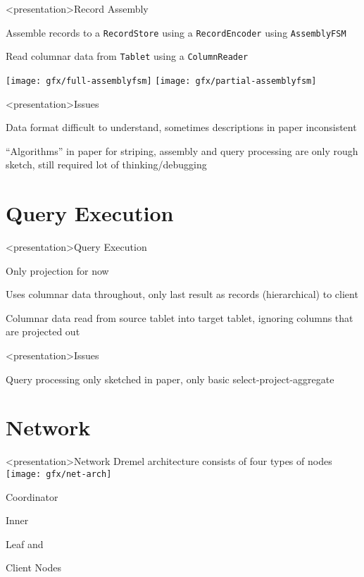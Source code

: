 \begin{frame}<presentation>{Record Assembly}
\begin{niitemize}
 \item Assemble records to a \texttt{RecordStore} using a
  \texttt{RecordEncoder} using \texttt{AssemblyFSM}
 \item Read columnar data from \texttt{Tablet} using a \texttt{ColumnReader}
\end{niitemize}

\texttt{[image: gfx/full-assemblyfsm]}
\hfill
\texttt{[image: gfx/partial-assemblyfsm]}
\end{frame}

\begin{frame}<presentation>{Issues}
\begin{niitemize}
 \item Data format difficult to understand, sometimes descriptions
  in paper inconsistent
 \item ``Algorithms'' in paper for striping, assembly and query processing are only
  rough sketch, still required lot of
  thinking/debugging
\end{niitemize}
\end{frame}

\section{Query Execution}
\begin{frame}<presentation>{Query Execution}
\begin{niitemize}
 \item Only projection for now
 \item Uses columnar data throughout, only last result as
  records (hierarchical) to client
 \item Columnar data read from source tablet into target tablet, ignoring
  columns that are projected out
\end{niitemize}
\end{frame}

\begin{frame}<presentation>{Issues}
\begin{niitemize}
 \item Query processing only sketched in paper, only basic
  select-project-aggregate
\end{niitemize}
\end{frame}

\section{Network}
\begin{frame}<presentation>{Network}
  Dremel architecture consists of four types of nodes
  \texttt{[image: gfx/net-arch]}
  \begin{niitemize}
    \item Coordinator
    \item Inner
    \item Leaf and
    \item Client Nodes
  \end{niitemize}
\end{frame}

